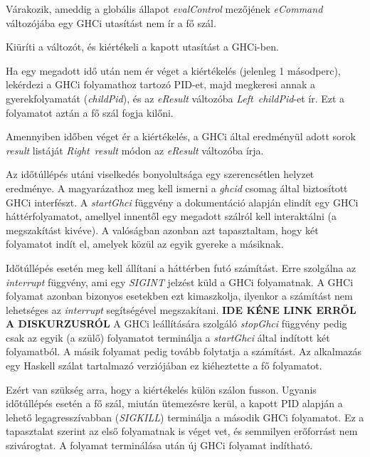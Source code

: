 \begin{compactenum}
	\item Várakozik, ameddig a globális állapot \textit{evalControl} mezőjének \textit{eCommand} változójába egy GHCi utasítást nem ír a fő szál.
	\item Kiüríti a változót, és kiértékeli a kapott utasítást a GHCi-ben.
	\item Ha egy megadott idő után nem ér véget a kiértékelés (jelenleg 1 másodperc), lekérdezi a GHCi folyamathoz tartozó PID-et, majd megkeresi annak a gyerekfolyamatát (\textit{childPid}), és az \textit{eResult} változóba \textit{Left\ childPid}-et ír. Ezt a folyamatot aztán a fő szál fogja kilőni.
	\item Amennyiben időben véget ér a kiértékelés, a GHCi által eredményül adott sorok \textit{result} listáját \textit{Right\ result} módon az \textit{eResult} változóba írja.
\end{compactenum}

Az időtúllépés utáni viselkedés bonyolultsága egy szerencsétlen helyzet eredménye. A magyarázathoz meg kell ismerni a \textit{ghcid} csomag által biztosított GHCi interfészt. A \textit{startGhci} függvény a dokumentáció alapján elindít egy GHCi háttérfolyamatot, amellyel innentől egy megadott szálról kell interaktálni (a megszakítást kivéve). A valóságban azonban azt tapasztaltam, hogy két folyamatot indít el, amelyek közül az egyik gyereke a másiknak. 

Időtúllépés esetén meg kell állítani a háttérben futó számítást. Erre szolgálna az \textit{interrupt} függvény, ami egy \textit{SIGINT} jelzést küld a GHCi folyamatnak. A GHCi folyamat azonban bizonyos esetekben ezt kimaszkolja, ilyenkor a számítást nem lehetséges az \textit{interrupt} segítségével megszakítani. \textbf{IDE KÉNE LINK ERRŐL A DISKURZUSRÓL} A GHCi leállítására szolgáló \textit{stopGhci} függvény pedig csak  az egyik (a szülő) folyamatot terminálja a \textit{startGhci} által indított két folyamatból. A másik folyamat pedig tovább folytatja a számítást. Az alkalmazás egy Haskell szálat tartalmazó verziójában ez kiéheztette a fő folyamatot. 

Ezért van szükség arra, hogy a kiértékelés külön szálon fusson. Ugyanis időtúllépés esetén a fő szál, miután ütemezésre kerül, a kapott PID alapján a lehető legagresszívabban (\textit{SIGKILL}) terminálja a második GHCi folyamatot. Ez a tapasztalat szerint az első folyamatnak is véget vet, és semmilyen erőforrást nem szivárogtat. A folyamat terminálása után új GHCi folyamat indítható.

